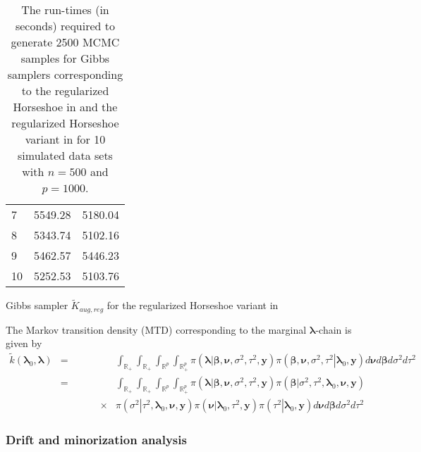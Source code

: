 \documentclass[noinfoline,11pt]{imsart}
\numberwithin{equation}{section}
\theoremstyle{plain}
\newcommand{\y}{\mathbf{y}}
\newcommand{\bl}{\boldsymbol{\lambda}}
\begin{document}
\begin{table}[hbt!]
\begin{subtable}[h]{0.45\textwidth}
\begin{tabular}{| l | l | l |}
        7 & 5549.28 & 5180.04\\
        8 & 5343.74 & 5102.16\\
        9 & 5462.57 & 5446.23\\
       10 & 5252.53 & 5103.76\\
        \hline
        \end{tabular}
        \caption{Gibbs sampler $\tilde K_{aug,reg}$ for the regularized Horseshoe variant in \cite{nishimura2019shrinkage}}
        \label{tab:week2}
     \end{subtable}
     \caption{The run-times (in seconds) required to generate 2500 MCMC samples for Gibbs samplers corresponding to the regularized Horseshoe in \cite{piironen2017} and the regularized Horseshoe variant in \cite{nishimura2019shrinkage} for 10 simulated data sets with 
     $n=500$ and $p=1000$.}
     \label{table_RegularizedHS}
\end{table}

\iffalse
The Markov transition density (MTD) corresponding to the marginal $\bl$-chain is given by \\
\begin{eqnarray}\label{MTDNishimurahorseshoe}
    \tilde k\left(\mathbf{\bl}_0,\mathbf{\bl}\right) &=& \int_{\mathbb{R}_+}\int_{\mathbb{R}_{+}}\int_{\mathbb{R}^p}\int_{\mathbb{R}_+^p}\pi\left(\left.\mathbf{\bl}\right|\boldsymbol{\beta,\nu},\sigma^2,\tau^2,\mathbf{\y}\right)\pi\left(\left.\boldsymbol{\beta,\nu},\sigma^2,\tau^2\right|\mathbf{\bl}_0,\mathbf{\y}\right)d\boldsymbol{\nu}d\boldsymbol{\beta}d\sigma^2d\tau^2 \nonumber\\
   &=& \int_{\mathbb{R}_+}\int_{\mathbb{R}_{+}}\int_{\mathbb{R}^p}\int_{\mathbb{R}^{p}_+}\pi\left(\left.\mathbf{\bl}\right|\boldsymbol{\beta,\nu},\sigma^2,\tau^2,\mathbf{\y}\right)\pi\left(\left.\boldsymbol{\beta}\right|\sigma^2,\tau^2,\mathbf{\bl}_0,\mathbf{\nu,\y}\right)\nonumber \\
    &\qquad \qquad \times& \pi\left(\left.\sigma^2\right|\tau^2,\mathbf{\bl}_0,\mathbf{\nu,\y}\right)\pi\left(\left.\boldsymbol{\nu}\right|\mathbf{\bl}_0,\tau^2,\mathbf{\y}\right)\pi\left(\left.\tau^2\right|\mathbf{\bl}_0,\mathbf{\y}\right)d\boldsymbol{\nu}d\boldsymbol{\beta}d\sigma^2d\tau^2
\end{eqnarray}

\noindent

\subsubsection{Drift and minorization analysis}
\end{document}
